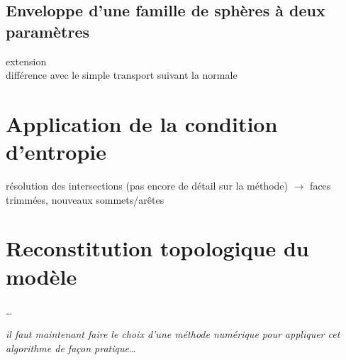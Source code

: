 \subsection{Enveloppe d'une famille de sphères à deux paramètres}
extension  \cite{gelston1995}\\
différence avec le simple transport suivant la normale \cite{jiao2001}


\section{Application de la condition d'entropie}
résolution des intersections (pas encore de détail sur la méthode) $\to$ faces trimmées, nouveaux sommets/arêtes

\section{Reconstitution topologique du modèle \brep}
\ldots


\bigskip
\textit{il faut maintenant faire le choix d'une méthode numérique pour appliquer cet algorithme de façon pratique\ldots}